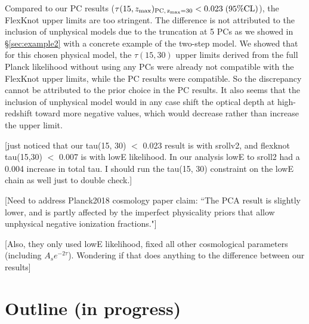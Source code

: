 \documentclass[prd,twocolumn,amsmath,amssymb,floatfix,superscriptaddress,nofootinbib]{revtex4-1}
\newcommand{\zmax}{z_{\rm max}}
\begin{document}
{Compared to our PC results ($\tau(15, \zmax)_{\rm PC,\, \zmax=30} < 0.023 \; (95\% \mathrm{CL})$), the FlexKnot upper limits are too stringent. The difference is not attributed to the inclusion of unphysical models due to the truncation at 5 PCs as we showed in \S\ref{sec:example2} with a concrete example of the two-step model. We showed that for this chosen physical model, the $\tau(15, 30)$ upper limits derived from the full Planck likelihood without using any PCs were already not compatible with the FlexKnot upper limits, while the PC results were compatible. So the discrepancy cannot be attributed to the prior choice in the PC results. It also seems that the inclusion of unphysical model would in any case shift the optical depth at high-redshift toward more negative values, which would decrease rather than increase the upper limit. 

[just noticed that our tau(15, 30) $<$ 0.023 result is with srollv2, and flexknot tau(15,30) $<$ 0.007 is with lowE likelihood. In our analysis lowE to sroll2 had a 0.004 increase in total tau. I should run the tau(15, 30) constraint on the lowE chain as well just to double check.]

[Need to address Planck2018 cosmology paper claim: ``The PCA result is slightly lower, and is partly affected by the imperfect physicality priors that allow unphysical negative ionization fractions."]

[Also, they only used lowE likelihood, fixed all other cosmological parameters (including $A_s e^{-2\tau}$). Wondering if that does anything to the difference between our results]



\section{Outline (in progress)}

}
\end{document}
